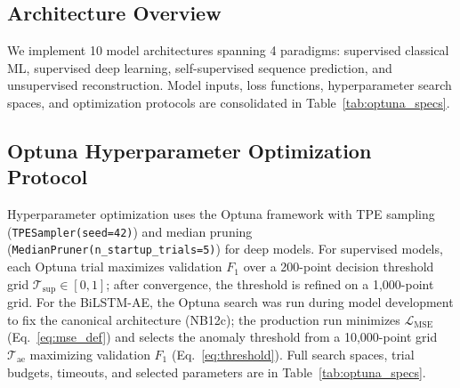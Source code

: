 \documentclass{elektr}
\begin{document}
\subsection{Architecture Overview}

We implement 10 model architectures spanning 4 paradigms: supervised classical ML,
supervised deep learning, self-supervised sequence prediction, and unsupervised
reconstruction. Model inputs, loss functions, hyperparameter search spaces, and
optimization protocols are consolidated in Table~\ref{tab:optuna_specs}.

\subsection{Optuna Hyperparameter Optimization Protocol}
\label{Sec:OptunaProtocol}

Hyperparameter optimization uses the Optuna framework with TPE sampling (\texttt{TPESampler(seed=42)}) and median pruning (\texttt{MedianPruner(n\_startup\_trials=5)}) for deep models. For supervised models, each Optuna trial maximizes validation $F_1$ over a 200-point decision threshold grid $\mathcal{T}_{\text{sup}}\in[0,1]$; after convergence, the threshold is refined on a 1,000-point grid. For the BiLSTM-AE, the Optuna search was run during model development to fix the canonical architecture (NB12c); the production run minimizes $\mathcal{L}_{\text{MSE}}$ (Eq.~\ref{eq:mse_def}) and selects the anomaly threshold from a 10,000-point grid $\mathcal{T}_{\text{ae}}$ maximizing validation $F_1$ (Eq.~\ref{eq:threshold}). Full search spaces, trial budgets, timeouts, and selected parameters are in Table~\ref{tab:optuna_specs}.
\end{document}
